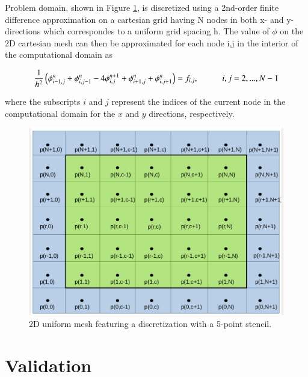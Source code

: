 Problem domain, shown in Figure \ref{fig:discretization}, is discretized using a 2nd-order
finite difference approximation on a cartesian grid having N nodes in both x- and y-directions which correspondes
to a uniform grid spacing h. The value of $\phi$ on the 2D cartesian mesh can then be approximated
for each node {i,j} in the interior of the computational domain as

\begin{equation}
\frac{1}{h^2} \left({{\phi}^n_{i-1,j}} + {{\phi}^n_{i,j-1}} -4 {{\phi}^{n+1}_{i,j}} + {{\phi}^n_{i+1,j}} + {{\phi}^n_{i,j+1}} \right) = f_{i,j}, \hspace{1 cm} i, j = 2,..., N-1
\label{eq:discretization}
\end{equation}

\noindent where the subscripts $i$ and $j$ represent the indices of the current node in the computational domain for the
$x$ and $y$ directions, respectively.

\begin{figure}
\begin{center}
\includegraphics[width=3.0 in]{pressure.eps}
\end{center}
\caption{2D uniform mesh featuring a discretization with a 5-point stencil.}
\label{fig:discretization} 
\end{figure}

\section{Validation}

